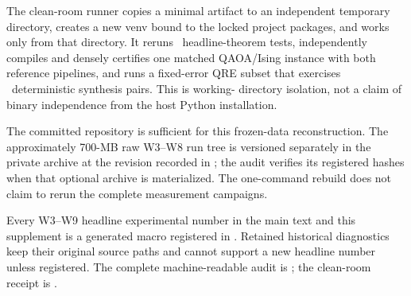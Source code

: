 \documentclass[a4paper,onecolumn,10pt,unpublished]{quantumarticle}
\begin{document}
The clean-room runner copies a minimal artifact to an independent temporary
directory, creates a new venv bound to the locked project packages, and works
only from that directory.  It reruns \CleanTheoryTests\ headline-theorem
tests, independently compiles and densely certifies one matched QAOA/Ising
instance with both reference pipelines, and runs a fixed-error QRE subset that
exercises \CleanGridPairs\ deterministic synthesis pairs.  This is working-
directory isolation, not a claim of binary independence from the host Python
installation.

The committed repository is sufficient for this frozen-data reconstruction.
The approximately 700-MB raw W3--W8 run tree is versioned separately in the
private  archive at the revision recorded in
; the audit verifies its registered hashes when that
optional archive is materialized.  The one-command rebuild does not claim to
rerun the complete measurement campaigns.

Every W3--W9 headline experimental number in the main text and this supplement
is a generated macro registered in .  Retained
historical diagnostics keep their original source paths and cannot support a
new headline number unless registered.  The complete machine-readable audit is
; the clean-room receipt is
.
\end{document}

